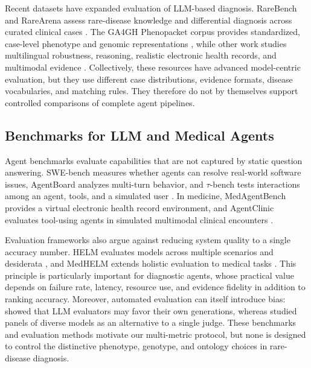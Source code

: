 \documentclass[letterpaper]{article} %
\begin{document}
Recent datasets have expanded evaluation of LLM-based diagnosis.
RareBench and RareArena assess rare-disease knowledge and differential
diagnosis across curated clinical cases
\citep{chen2024rarebench,chen2026rarearena}. The GA4GH Phenopacket corpus
provides standardized, case-level phenotype and genomic representations
\citep{danis2025phenopackets}, while other work studies multilingual
robustness, reasoning, realistic electronic health records, and multimodal
evidence
\citep{chimirri2025consistent,qiu2025medrbench,eizaldin2026mimicrd,
ning2026mmrarebench}. Collectively, these resources have advanced
model-centric evaluation, but they use different case distributions, evidence
formats, disease vocabularies, and matching rules. They therefore do not by
themselves support controlled comparisons of complete agent pipelines.

\subsection{Benchmarks for LLM and Medical Agents}

Agent benchmarks evaluate capabilities that are not captured by static
question answering. SWE-bench measures whether agents can resolve real-world
software issues, AgentBoard analyzes multi-turn behavior, and
$\tau$-bench tests interactions among an agent, tools, and a simulated user
\citep{jimenez2024swebench,ma2024agentboard,yao2025taubench}. In medicine,
MedAgentBench provides a virtual electronic health record environment, and
AgentClinic evaluates tool-using agents in simulated multimodal clinical
encounters \citep{jiang2025medagentbench,schmidgall2026agentclinic}.

Evaluation frameworks also argue against reducing system quality to a single
accuracy number. HELM evaluates models across multiple scenarios and
desiderata \citep{liang2023helm}, and MedHELM extends holistic
evaluation to medical tasks \citep{bedi2026medhelm}. This principle is
particularly important for diagnostic agents, whose practical value depends
on failure rate, latency, resource use, and evidence fidelity in addition to
ranking accuracy. Moreover, automated evaluation can itself introduce bias:
\citet{panickssery2024selfpreference} showed that LLM evaluators may favor
their own generations, whereas \citet{verga2024juries} studied panels of
diverse models as an alternative to a single judge. These benchmarks and
evaluation methods motivate our multi-metric protocol, but none is designed
to control the distinctive phenotype, genotype, and ontology choices in
rare-disease diagnosis.
\end{document}
